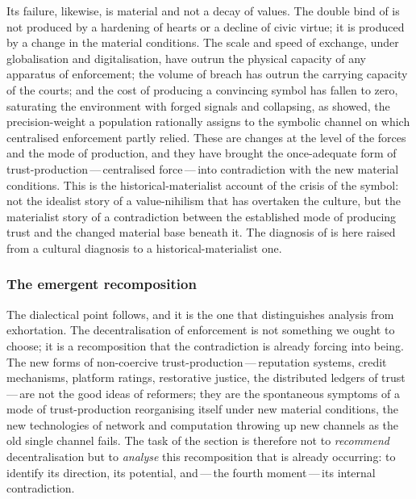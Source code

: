 Its failure, likewise, is material and not a decay of values. The double bind of  is not produced by a hardening of hearts or a decline of civic virtue; it is produced by a change in the material conditions. The scale and speed of exchange, under globalisation and digitalisation, have outrun the physical capacity of any apparatus of enforcement; the volume of breach has outrun the carrying capacity of the courts; and the cost of producing a convincing symbol has fallen to zero, saturating the environment with forged signals and collapsing, as  showed, the precision-weight a population rationally assigns to the symbolic channel on which centralised enforcement partly relied. These are changes at the level of the forces and the mode of production, and they have brought the once-adequate form of trust-production\,---\,centralised force\,---\,into contradiction with the new material conditions. This is the historical-materialist account of the crisis of the symbol: not the idealist story of a value-nihilism that has overtaken the culture, but the materialist story of a contradiction between the established mode of producing trust and the changed material base beneath it. The diagnosis of  is here raised from a cultural diagnosis to a historical-materialist one.

\subsubsection{The emergent recomposition}
\label{p13:sub:jud-emergence}

The dialectical point follows, and it is the one that distinguishes analysis from exhortation. The decentralisation of enforcement is not something we ought to choose; it is a recomposition that the contradiction is already forcing into being. The new forms of non-coercive trust-production\,---\,reputation systems, credit mechanisms, platform ratings, restorative justice, the distributed ledgers of trust\,---\,are not the good ideas of reformers; they are the spontaneous symptoms of a mode of trust-production reorganising itself under new material conditions, the new technologies of network and computation throwing up new channels as the old single channel fails. The task of the section is therefore not to \emph{recommend} decentralisation but to \emph{analyse} this recomposition that is already occurring: to identify its direction, its potential, and\,---\,the fourth moment\,---\,its internal contradiction.

